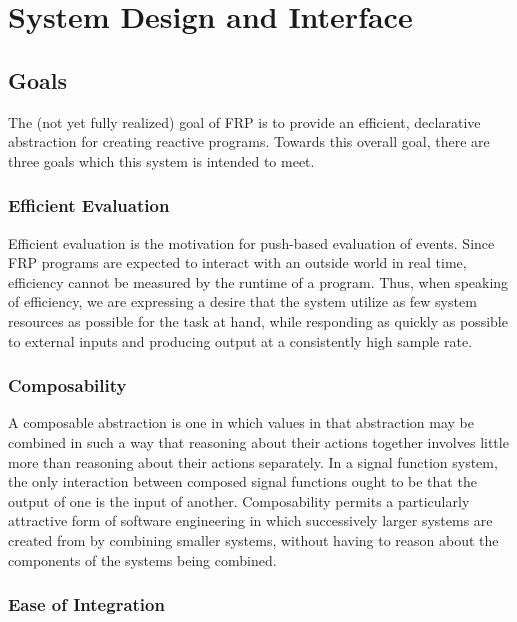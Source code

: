\chapter{System Design and Interface}
\label{chapter:System_Design_and_Interface}

\section{Goals}
\label{section:System_Design_and_Interface-Goals}

The (not yet fully realized) goal of FRP is to provide an efficient, declarative
abstraction for creating reactive programs. Towards this overall goal, there are
three goals which this system is intended to meet.

\subsection{Efficient Evaluation}
\label{subsection:System_Design_and_Interface-Goals-Efficient_and_Push_based_Evaluation}

Efficient evaluation is the motivation for push-based evaluation of events.
Since FRP programs are expected to  interact with an outside world in real time,
efficiency cannot be measured by the runtime of a program. Thus, when speaking of efficiency,
we are expressing a desire that the system utilize as few system resources as possible
for the task at hand, while responding as quickly as possible to external inputs and
producing output at a consistently high sample rate.

\subsection{Composability}
\label{subsection:System_Design_and_Interface-Goals-Composability}

A composable abstraction is one in which values in that abstraction may be
combined in such a way that reasoning about their actions together involves
little more than reasoning about their actions separately. In a signal function
system, the only interaction between composed signal functions ought to be that
the output of one is the input of another. Composability permits a particularly
attractive form of software engineering in which successively larger systems are
created from by combining smaller systems, without having to reason about the 
components of the systems being combined.

\subsection{Ease of Integration}
\label{subsection:System_Design_and_Interface-Goals-Ease_of_Integration}

